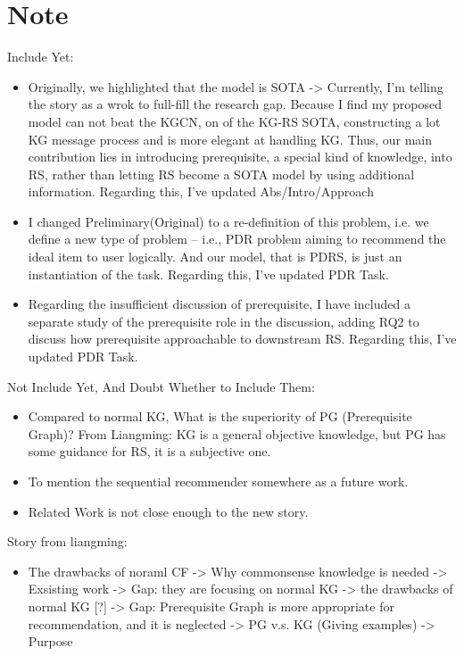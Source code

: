 \section{Note}
Include Yet:
\begin{itemize}
    \item Originally, we highlighted that the model is SOTA -> Currently, I'm telling the story as a wrok to full-fill the research gap. Because I find my proposed model can not beat the KGCN, on of the KG-RS SOTA, constructing a lot KG message process and is more elegant at handling KG. Thus, our main contribution lies in introducing prerequisite, a special kind of knowledge, into RS, rather than letting RS become a SOTA model by using additional information.
    Regarding this, I've updated Abs/Intro/Approach
    \item I changed Preliminary(Original) to a re-definition of this problem, i.e. we define a new type of problem -- i.e., PDR problem aiming to recommend the ideal item to user logically. And our model, that is PDRS, is just an instantiation of the task. Regarding this, I've updated PDR Task.
    \item Regarding the insufficient discussion of prerequisite, I have included a separate study of the prerequisite role in the discussion, adding RQ2 to discuss how prerequisite approachable to downstream RS. Regarding this, I've updated PDR Task.

\end{itemize}

Not Include Yet, And Doubt Whether to Include Them:
\begin{itemize}
    \item Compared to normal KG, What is the superiority of PG (Prerequisite Graph)?
    From Liangming: KG is a general objective knowledge, but PG has some guidance for RS, it is a subjective one.
    
    \item To mention the sequential recommender somewhere as a future work.
    \item Related Work is not close enough to the new story.
\end{itemize}


Story from liangming:
\begin{itemize}
    \item The drawbacks of noraml CF -> Why commonsense knowledge is needed -> Exsisting work -> Gap: they are focusing on normal KG -> the drawbacks of normal KG [?] -> Gap: Prerequisite Graph is more appropriate for recommendation, and it is neglected -> PG v.s. KG (Giving examples) -> Purpose
\end{itemize}